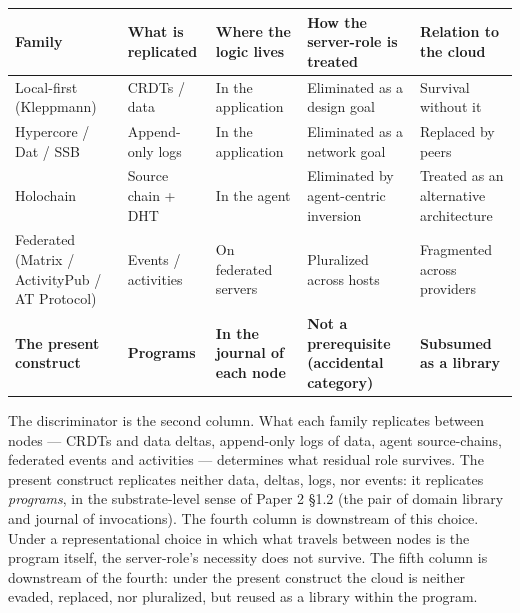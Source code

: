\documentclass[
]{article}
\newcounter{none} %
\begin{document}
{\def\LTcaptype{none} %
\begin{longtable}[]{@{}
  >{\raggedright\arraybackslash}p{}
  >{\raggedright\arraybackslash}p{}
  >{\raggedright\arraybackslash}p{}
  >{\raggedright\arraybackslash}p{}
  >{\raggedright\arraybackslash}p{}@{}}
\toprule\noalign{}
\begin{minipage}[b]{\linewidth}\raggedright
Family
\end{minipage} & \begin{minipage}[b]{\linewidth}\raggedright
What is replicated
\end{minipage} & \begin{minipage}[b]{\linewidth}\raggedright
Where the logic lives
\end{minipage} & \begin{minipage}[b]{\linewidth}\raggedright
How the server-role is treated
\end{minipage} & \begin{minipage}[b]{\linewidth}\raggedright
Relation to the cloud
\end{minipage} \\
\midrule\noalign{}
\endhead
\bottomrule\noalign{}
\endlastfoot
Local-first (Kleppmann) & CRDTs / data & In the application & Eliminated
as a design goal & Survival without it \\
Hypercore / Dat / SSB & Append-only logs & In the application &
Eliminated as a network goal & Replaced by peers \\
Holochain & Source chain + DHT & In the agent & Eliminated by
agent-centric inversion & Treated as an alternative architecture \\
Federated (Matrix / ActivityPub / AT Protocol) & Events / activities &
On federated servers & Pluralized across hosts & Fragmented across
providers \\
\textbf{The present construct} & \textbf{Programs} & \textbf{In the
journal of each node} & \textbf{Not a prerequisite (accidental
category)} & \textbf{Subsumed as a library} \\
\end{longtable}
}

The discriminator is the second column. What each family replicates
between nodes --- CRDTs and data deltas, append-only logs of data, agent
source-chains, federated events and activities --- determines what
residual role survives. The present construct replicates neither data,
deltas, logs, nor events: it replicates \emph{programs}, in the
substrate-level sense of Paper 2 §1.2 (the pair of domain library and
journal of invocations). The fourth column is downstream of this choice.
Under a representational choice in which what travels between nodes is
the program itself, the server-role's necessity does not survive. The
fifth column is downstream of the fourth: under the present construct
the cloud is neither evaded, replaced, nor pluralized, but reused as a
library within the program.
\end{document}
